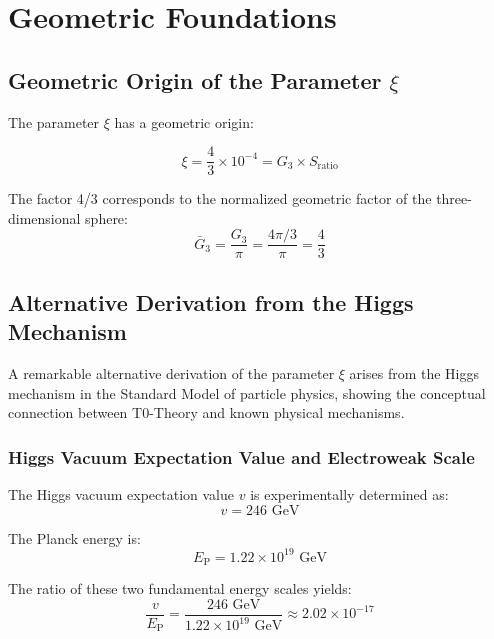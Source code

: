\documentclass[12pt,a4paper]{article}
\newcommand{\ep}{E_{\text{P}}}
\theoremstyle{definition}
\begin{document}
	\section{Geometric Foundations}
	
	\subsection{Geometric Origin of the Parameter $\xi$}
	
	The parameter $\xi$ has a geometric origin:
	
	\begin{equation}
		\xi = \frac{4}{3} \times 10^{-4} = G_3 \times S_{\text{ratio}}
	\end{equation}
	
	The factor 4/3 corresponds to the normalized geometric factor of the three-dimensional sphere:
	\begin{equation}
		\bar{G}_3 = \frac{G_3}{\pi} = \frac{4\pi/3}{\pi} = \frac{4}{3}
	\end{equation}
	
	\subsection{Alternative Derivation from the Higgs Mechanism}
	
	A remarkable alternative derivation of the parameter $\xi$ arises from the Higgs mechanism in the Standard Model of particle physics, showing the conceptual connection between T0-Theory and known physical mechanisms.
	
	\subsubsection{Higgs Vacuum Expectation Value and Electroweak Scale}
	
	The Higgs vacuum expectation value $v$ is experimentally determined as:
	\begin{equation}
		v = 246 \text{ GeV}
	\end{equation}
	
	The Planck energy is:
	\begin{equation}
		\ep = 1.22 \times 10^{19} \text{ GeV}
	\end{equation}
	
	The ratio of these two fundamental energy scales yields:
	\begin{equation}
		\frac{v}{\ep} = \frac{246 \text{ GeV}}{1.22 \times 10^{19} \text{ GeV}} \approx 2.02 \times 10^{-17}
	\end{equation}
	
\end{document}
